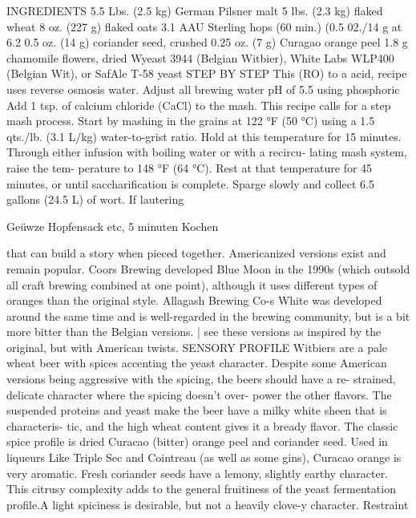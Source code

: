 \documentclass[a4paper,parskip=half]{scrartcl}
\begin{document}
INGREDIENTS
5.5 Lbs. (2.5 kg) German Pilsner malt
5 lbs. (2.3 kg) flaked wheat
8 oz. (227 g) flaked oats
3.1 AAU Sterling hops (60 min.)
(0.5 02./14 g at 6.2%
0.5 oz. (14 g) coriander seed, crushed
0.25 oz. (7 g) Curagao orange peel
1.8 g chamomile flowers, dried
Wyeast 3944 (Belgian Witbier), White
Labs WLP400 (Belgian Wit),
or SafAle T-58 yeast
STEP BY STEP
This
(RO)
to a
acid,
recipe uses reverse osmosis
water. Adjust all brewing water
pH of 5.5 using phosphoric
Add 1 tsp. of calcium chloride
(CaCl) to the mash.
This recipe calls for a step mash
process. Start by mashing in the
grains at 122 °F (50 °C) using a 1.5
qts./lb. (3.1 L/kg) water-to-grist
ratio. Hold at this temperature for
15 minutes. Through either infusion
with boiling water or with a recircu-
lating mash system, raise the tem-
perature to 148 °F (64 °C). Rest at
that temperature for 45 minutes, or
until saccharification is complete.
Sparge slowly and collect 6.5
gallons (24.5 L) of wort. If lautering

Geüwze Hopfensack etc, 5 minuten
Kochen

\parencite[26]{Strong2021}

that can build a story when pieced together.
Americanized versions exist and remain popular. Coors
Brewing developed Blue Moon in the 1990s (which outsold
all craft brewing combined at one point), although it uses
different types of oranges than the original style. Allagash
Brewing Co-s White was developed around the same time
and is well-regarded in the brewing community, but is a bit
more bitter than the Belgian versions. | see these versions as
inspired by the original, but with American twists.
SENSORY PROFILE
Witbiers are a pale wheat beer with spices accenting the
yeast character. Despite some American versions being
aggressive with the spicing, the beers should have a re-
strained, delicate character where the spicing doesn’t over-
power the other flavors. The suspended proteins and yeast
make the beer have a milky white sheen that is characteris-
tic, and the high wheat content gives it a bready flavor.
The classic spice profile is dried Curacao (bitter) orange
peel and coriander seed. Used in liqueurs Like Triple Sec
and Cointreau (as well as some gins), Curacao orange is
very aromatic. Fresh coriander seeds have a lemony, slightly
earthy character. This citrusy complexity adds to the general
fruitiness of the yeast fermentation profile.A light spiciness
is desirable, but not a heavily clove-y character. Restraint
\end{document}
